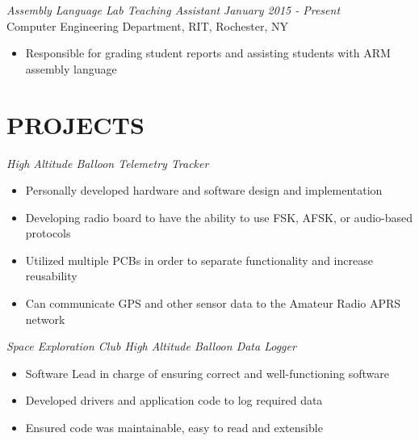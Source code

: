 \documentclass[line,margin]{res}
\begin{document}
\begin{resume}

	\vspace{-5pt}
		{\sl Assembly Language Lab Teaching Assistant } \hfill {\sl January 2015 - Present} \\
		Computer Engineering Department, RIT, Rochester, NY
		\begin{itemize}  \itemsep -2pt %
			\item Responsible for grading student reports and assisting students with ARM assembly language 
		\end{itemize} 
\section{PROJECTS}
	{\sl High Altitude Balloon Telemetry Tracker }
		\begin{itemize} \itemsep -2pt
			\item Personally developed hardware and software design and implementation
			\item Developing radio board to have the ability to use FSK, AFSK, or audio-based protocols
			\item Utilized multiple PCBs in order to separate functionality and increase reusability
			\item Can communicate GPS and other sensor data to the Amateur Radio APRS network
		\end{itemize}

	\vspace{-10pt}
	{\sl Space Exploration Club High Altitude Balloon Data Logger}
		\begin{itemize} \itemsep -2pt
			\item Software Lead in charge of ensuring correct and well-functioning software
			\item Developed drivers and application code to log required data
			\item Ensured code was maintainable, easy to read and extensible
			

\end{itemize}
\end{resume}
\end{document}
